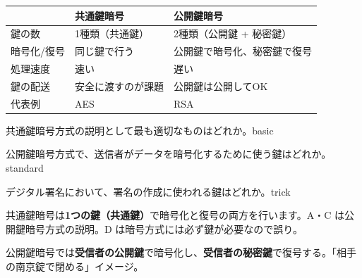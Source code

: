 \begin{comparison}
\begin{tabularx}{\textwidth}{lXX}
  \toprule
  & \textbf{共通鍵暗号} & \textbf{公開鍵暗号} \\
  \midrule
  鍵の数 & 1種類（共通鍵） & 2種類（公開鍵 + 秘密鍵） \\
  暗号化/復号 & 同じ鍵で行う & 公開鍵で暗号化、秘密鍵で復号 \\
  処理速度 & 速い & 遅い \\
  鍵の配送 & 安全に渡すのが課題 & 公開鍵は公開してOK \\
  代表例 & AES & RSA \\
  \bottomrule
\end{tabularx}
\end{comparison}


\begin{mondai}{共通鍵暗号方式の説明として最も適切なものはどれか。}{basic}
\end{mondai}

\begin{mondai}{公開鍵暗号方式で、送信者がデータを暗号化するために使う鍵はどれか。}{standard}
\end{mondai}

\begin{mondai}{デジタル署名において、署名の作成に使われる鍵はどれか。}{trick}
\end{mondai}

\kaitoupage


\begin{kaisetsu}
共通鍵暗号は\textbf{1つの鍵（共通鍵）}で暗号化と復号の両方を行います。A・C は公開鍵暗号方式の説明。D は暗号方式には必ず鍵が必要なので誤り。
\end{kaisetsu}


\begin{kaisetsu}
公開鍵暗号では\textbf{受信者の公開鍵}で暗号化し、\textbf{受信者の秘密鍵}で復号する。「相手の南京錠で閉める」イメージ。
\end{kaisetsu}

